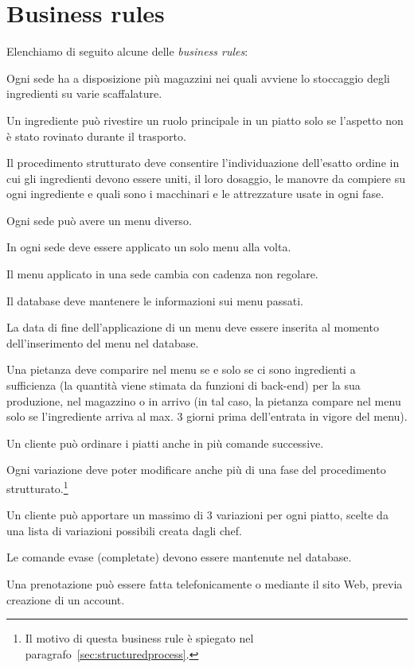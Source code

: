 \section{Business rules} \label{sec:businessrules}
Elenchiamo di seguito alcune delle {\it business rules}:
\begin{enumbusinessrules}
\item Ogni sede ha a disposizione più magazzini nei quali avviene lo stoccaggio degli ingredienti su varie scaffalature.
\item Un ingrediente può rivestire un ruolo principale in un piatto solo se l'aspetto non è stato rovinato durante il trasporto.
\item Il procedimento strutturato deve consentire l'individuazione dell'esatto ordine in cui gli ingredienti devono essere uniti, il loro dosaggio, le manovre da compiere su ogni ingrediente e quali sono i macchinari e le attrezzature usate in ogni fase.
\item Ogni sede può avere un menu diverso.
\item In ogni sede deve essere applicato un solo menu alla volta.
\item Il menu applicato in una sede cambia con cadenza non regolare.
\item Il database deve mantenere le informazioni sui menu passati.
\item\label{br.menuenddate} La data di fine dell'applicazione di un menu deve essere inserita al momento dell'inserimento del menu nel database.
\item Una pietanza deve comparire nel menu se e solo se ci sono ingredienti a sufficienza (la quantità viene stimata da funzioni di back-end) per la sua produzione, nel magazzino o in arrivo (in tal caso, la pietanza compare nel menu solo se l'ingrediente arriva al max. 3 giorni prima dell'entrata in vigore del menu).
\item Un cliente può ordinare i piatti anche in più comande successive.
\item\label{br.variations} Ogni variazione deve poter modificare anche più di una fase del procedimento strutturato.\footnote{Il motivo di questa business rule è spiegato nel paragrafo~\vref{sec:structuredprocess}.}
\item Un cliente può apportare un massimo di 3 variazioni per ogni piatto, scelte da una lista di variazioni possibili creata dagli chef.
\item Le comande evase (completate) devono essere mantenute nel database.
\item Una prenotazione può essere fatta telefonicamente o mediante il sito Web, previa creazione di un account.

\end{enumbusinessrules}
